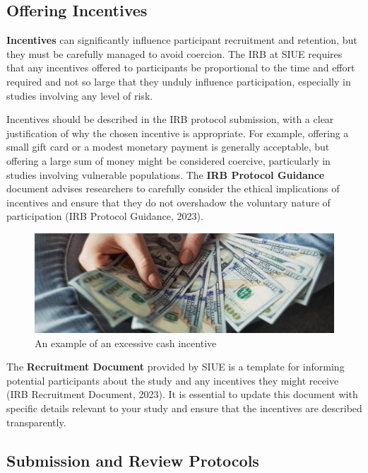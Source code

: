 \documentclass[
]{book}
\begin{document}
\subsection*{Offering Incentives}\label{offering-incentives}

\textbf{Incentives} can significantly influence participant recruitment and retention, but they must be carefully managed to avoid coercion. The IRB at SIUE requires that any incentives offered to participants be proportional to the time and effort required and not so large that they unduly influence participation, especially in studies involving any level of risk.

Incentives should be described in the IRB protocol submission, with a clear justification of why the chosen incentive is appropriate. For example, offering a small gift card or a modest monetary payment is generally acceptable, but offering a large sum of money might be considered coercive, particularly in studies involving vulnerable populations. The \textbf{IRB Protocol Guidance} document advises researchers to carefully consider the ethical implications of incentives and ensure that they do not overshadow the voluntary nature of participation (IRB Protocol Guidance, 2023).

\begin{figure}
\centering
\includegraphics{images/fig01e.jpg}
\caption{An example of an excessive cash incentive}
\end{figure}

The \textbf{Recruitment Document} provided by SIUE is a template for informing potential participants about the study and any incentives they might receive (IRB Recruitment Document, 2023). It is essential to update this document with specific details relevant to your study and ensure that the incentives are described transparently.

\subsection*{Submission and Review Protocols}\label{submission-and-review-protocols}
\end{document}
